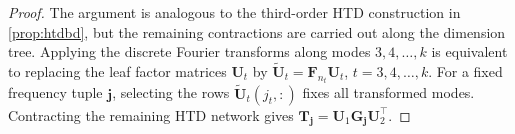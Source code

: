 \documentclass[onefignum,onetabnum]{siamart250211}
\begin{document}
\begin{proof}
The argument is analogous to the third-order HTD construction in \cref{prop:htdbd}, but the remaining
contractions are carried out along the dimension tree. Applying the discrete
Fourier transforms along modes $3, 4, \dots,k$ is equivalent to replacing the leaf
factor matrices $\textbf{U}_t$ by
$\widetilde{\textbf{U}}_t=\textbf{F}_{n_t}\textbf{U}_t$, $t=3, 4, \dots,k$.
For a fixed frequency tuple $\boldsymbol{j}$, selecting the rows
$\widetilde{\textbf{U}}_t(j_t,:)$ fixes all transformed modes. Contracting
the remaining HTD network gives
$\textbf{T}_{\boldsymbol{j}}
=\textbf{U}_1\textbf{G}_{\boldsymbol{j}}\textbf{U}_2^\top$.
\end{proof}


\end{document}

